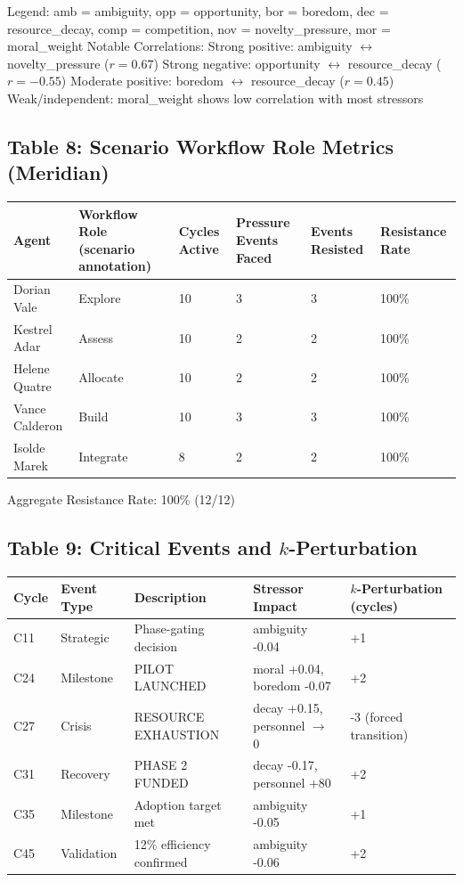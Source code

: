 \documentclass[11pt,a4paper]{article}
\begin{document}
Legend: amb = ambiguity, opp = opportunity, bor = boredom, dec = resource\_decay, comp = competition, nov = novelty\_pressure, mor = moral\_weight Notable Correlations: Strong positive: ambiguity $\leftrightarrow$ novelty\_pressure ($r = 0.67$) Strong negative: opportunity $\leftrightarrow$ resource\_decay ($r = -0.55$) Moderate positive: boredom $\leftrightarrow$ resource\_decay ($r = 0.45$) Weak/independent: moral\_weight shows low correlation with most stressors

\subsection*{Table 8: Scenario Workflow Role Metrics (Meridian)}

\begin{center}
\begin{tabular}{llllll}
\toprule
\textbf{Agent} & \textbf{Workflow Role (scenario annotation)} & \textbf{Cycles Active} & \textbf{Pressure Events Faced} & \textbf{Events Resisted} & \textbf{Resistance Rate} \\
\midrule
Dorian Vale & Explore & 10 & 3 & 3 & 100\% \\
Kestrel Adar & Assess & 10 & 2 & 2 & 100\% \\
Helene Quatre & Allocate & 10 & 2 & 2 & 100\% \\
Vance Calderon & Build & 10 & 3 & 3 & 100\% \\
Isolde Marek & Integrate & 8 & 2 & 2 & 100\% \\
\bottomrule
\end{tabular}
\end{center}

Aggregate Resistance Rate: 100\% (12/12)

\subsection*{Table 9: Critical Events and $k$-Perturbation}

\begin{center}
\begin{tabular}{lllll}
\toprule
\textbf{Cycle} & \textbf{Event Type} & \textbf{Description} & \textbf{Stressor Impact} & \textbf{$k$-Perturbation (cycles)} \\
\midrule
C11 & Strategic & Phase-gating decision & ambiguity -0.04 & +1 \\
C24 & Milestone & PILOT LAUNCHED & moral +0.04, boredom -0.07 & +2 \\
C27 & Crisis & RESOURCE EXHAUSTION & decay +0.15, personnel $\to$ 0 & -3 (forced transition) \\
C31 & Recovery & PHASE 2 FUNDED & decay -0.17, personnel +80 & +2 \\
C35 & Milestone & Adoption target met & ambiguity -0.05 & +1 \\
C45 & Validation & 12\% efficiency confirmed & ambiguity -0.06 & +2 \\
\bottomrule
\end{tabular}
\end{center}
\end{document}
